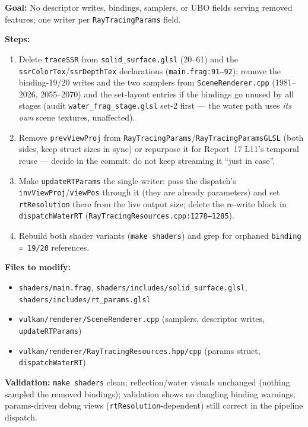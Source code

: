 \documentclass[11pt,a4paper]{article}
\begin{document}
\begin{tcolorbox}[promptbox={Prompt: Remove Dead SSR Plumbing and Single-Source the RT Params Writes}]
\textbf{Goal:} No descriptor writes, bindings, samplers, or UBO fields serving removed features; one writer per \texttt{RayTracingParams} field.

\textbf{Steps:}
\begin{enumerate}
    \item Delete \texttt{traceSSR} from \texttt{solid\_surface.glsl} (20--61) and the \texttt{ssrColorTex}/\texttt{ssrDepthTex} declarations (\texttt{main.frag:91--92}); remove the binding-19/20 writes and the two samplers from \texttt{SceneRenderer.cpp} (1981--2026, 2055--2070) and the set-layout entries if the bindings go unused by all stages (audit \texttt{water\_frag\_stage.glsl} set-2 first --- the water path uses \emph{its own} scene textures, unaffected).
    \item Remove \texttt{prevViewProj} from \texttt{RayTracingParams}/\texttt{RayTracingParamsGLSL} (both sides, keep struct sizes in sync) or repurpose it for Report~17 L11's temporal reuse --- decide in the commit; do not keep streaming it ``just in case''.
    \item Make \texttt{updateRTParams} the single writer: pass the dispatch's \texttt{invViewProj}/\texttt{viewPos} through it (they are already parameters) and set \texttt{rtResolution} there from the live output size; delete the re-write block in \texttt{dispatchWaterRT} (\texttt{RayTracingResources.cpp:1278--1285}).
    \item Rebuild both shader variants (\texttt{make shaders}) and grep for orphaned \texttt{binding = 19/20} references.
\end{enumerate}

\textbf{Files to modify:}
\begin{itemize}
    \item \texttt{shaders/main.frag}, \texttt{shaders/includes/solid\_surface.glsl}, \texttt{shaders/includes/rt\_params.glsl}
    \item \texttt{vulkan/renderer/SceneRenderer.cpp} (samplers, descriptor writes, \texttt{updateRTParams})
    \item \texttt{vulkan/renderer/RayTracingResources.hpp/cpp} (params struct, \texttt{dispatchWaterRT})
\end{itemize}

\textbf{Validation:} \texttt{make shaders} clean; reflection/water visuals unchanged (nothing sampled the removed bindings); validation shows no dangling binding warnings; params-driven debug views (\texttt{rtResolution}-dependent) still correct in the pipeline dispatch.
\end{tcolorbox}
\end{document}
